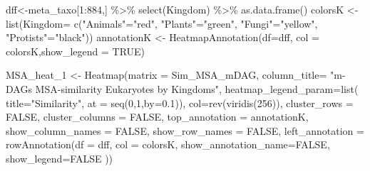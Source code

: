 \documentclass[
  letterpaper,
  DIV=11,
  numbers=noendperiod]{scrreprt}
\newenvironment{Shaded}{}{}
\newcommand{\AttributeTok}[1]{\textcolor[rgb]{0.78,0.47,0.87}{#1}}
\newcommand{\ConstantTok}[1]{\textcolor[rgb]{0.82,0.60,0.40}{#1}}
\newcommand{\DecValTok}[1]{\textcolor[rgb]{0.82,0.60,0.40}{#1}}
\newcommand{\FloatTok}[1]{\textcolor[rgb]{0.82,0.60,0.40}{#1}}
\newcommand{\FunctionTok}[1]{\textcolor[rgb]{0.38,0.69,0.94}{#1}}
\newcommand{\NormalTok}[1]{\textcolor[rgb]{0.67,0.70,0.75}{#1}}
\newcommand{\OtherTok}[1]{\textcolor[rgb]{0.15,0.68,0.38}{#1}}
\newcommand{\SpecialCharTok}[1]{\textcolor[rgb]{0.34,0.71,0.76}{#1}}
\newcommand{\StringTok}[1]{\textcolor[rgb]{0.60,0.76,0.47}{#1}}
\begin{document}
\begin{Shaded}
\begin{Highlighting}[]
\NormalTok{dff}\OtherTok{\textless{}{-}}\NormalTok{meta\_taxo[}\DecValTok{1}\SpecialCharTok{:}\DecValTok{884}\NormalTok{,] }\SpecialCharTok{\%\textgreater{}\%} \FunctionTok{select}\NormalTok{(Kingdom)  }\SpecialCharTok{\%\textgreater{}\%} \FunctionTok{as.data.frame}\NormalTok{()}
\NormalTok{colorsK }\OtherTok{\textless{}{-}} \FunctionTok{list}\NormalTok{(}\AttributeTok{Kingdom=} \FunctionTok{c}\NormalTok{(}\StringTok{"Animals"}\OtherTok{=}\StringTok{"red"}\NormalTok{,}
                           \StringTok{"Plants"}\OtherTok{=}\StringTok{"green"}\NormalTok{,}
                           \StringTok{"Fungi"}\OtherTok{=}\StringTok{"yellow"}\NormalTok{,}
                           \StringTok{"Protists"}\OtherTok{=}\StringTok{"black"}\NormalTok{))}
\NormalTok{annotationK }\OtherTok{\textless{}{-}} \FunctionTok{HeatmapAnnotation}\NormalTok{(}\AttributeTok{df=}\NormalTok{dff, }\AttributeTok{col =}\NormalTok{ colorsK,}\AttributeTok{show\_legend =} \ConstantTok{TRUE}\NormalTok{)}

\NormalTok{MSA\_heat\_1 }\OtherTok{\textless{}{-}} \FunctionTok{Heatmap}\NormalTok{(}\AttributeTok{matrix =}\NormalTok{ Sim\_MSA\_mDAG, }
                      \AttributeTok{column\_title=}
                        \StringTok{"m{-}DAGs MSA{-}similarity Eukaryotes by Kingdoms"}\NormalTok{,}
                      \AttributeTok{heatmap\_legend\_param=}\FunctionTok{list}\NormalTok{(}
                        \AttributeTok{title=}\StringTok{"Similarity"}\NormalTok{,}
                        \AttributeTok{at =} \FunctionTok{seq}\NormalTok{(}\DecValTok{0}\NormalTok{,}\DecValTok{1}\NormalTok{,}\AttributeTok{by=}\FloatTok{0.1}\NormalTok{)),}
                      \AttributeTok{col=}\FunctionTok{rev}\NormalTok{(}\FunctionTok{viridis}\NormalTok{(}\DecValTok{256}\NormalTok{)),}
                      \AttributeTok{cluster\_rows =} \ConstantTok{FALSE}\NormalTok{,}
                      \AttributeTok{cluster\_columns =} \ConstantTok{FALSE}\NormalTok{,}
                      \AttributeTok{top\_annotation =}\NormalTok{ annotationK,}
                      \AttributeTok{show\_column\_names =} \ConstantTok{FALSE}\NormalTok{, }
                      \AttributeTok{show\_row\_names =} \ConstantTok{FALSE}\NormalTok{,}
                      \AttributeTok{left\_annotation =}
                        \FunctionTok{rowAnnotation}\NormalTok{(}\AttributeTok{df =}\NormalTok{ dff,}
                                      \AttributeTok{col =}\NormalTok{ colorsK,}
                                    \AttributeTok{show\_annotation\_name=}\ConstantTok{FALSE}\NormalTok{,}
                                    \AttributeTok{show\_legend=}\ConstantTok{FALSE}
\NormalTok{                                      ))}



\end{Highlighting}
\end{Shaded}
\end{document}
